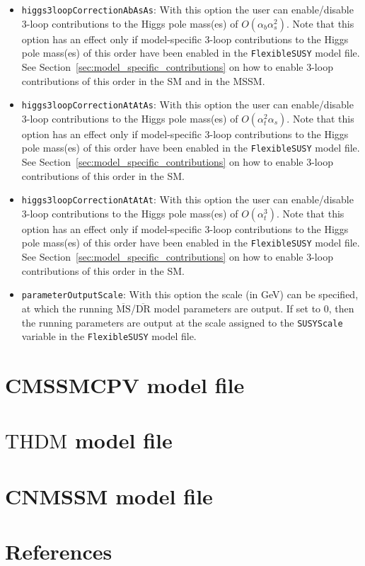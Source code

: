\documentclass[final,3p,11pt,pdflatex]{elsarticle}
\makeatletter
\newcommand{\fs}{\texttt{FlexibleSUSY}\@\xspace}
\newcommand{\code}[1]{\lstinline|#1|}  %
\newcommand{\ol}[1]{\overline{#1}}
\newcommand{\MSbar}{\ensuremath{\ol{\text{MS}}}\xspace}
\newcommand{\DRbar}{\ensuremath{\ol{\text{DR}}}\xspace}
\newcommand{\THDM}{\ensuremath{\text{THDM}}\xspace}
\newcommand{\secref}[1]{Section~\ref{#1}}
\def\at{\alpha_t}
\def\ab{\alpha_b}
\def\as{\alpha_s}
\makeatother
\begin{document}
\begin{itemize}
\item[\texttt{FlexibleSUSY[27]},] \texttt{higgs3loopCorrectionAbAsAs}:
  With this option the user can enable/disable 3-loop contributions to
  the Higgs pole mass(es) of $O(\ab\as^2)$.  Note that this option
  has an effect only if model-specific 3-loop contributions to the
  Higgs pole mass(es) of this order have been enabled in the \fs model file.
  See \secref{sec:model_specific_contributions} on how to enable
  3-loop contributions of this order in the SM and in the
  MSSM\@.

\item[\texttt{FlexibleSUSY[28]},] \texttt{higgs3loopCorrectionAtAtAs}:
  With this option the user can enable/disable 3-loop contributions to
  the Higgs pole mass(es) of $O(\at^2\as)$.  Note that this option
  has an effect only if model-specific 3-loop contributions to the
  Higgs pole mass(es) of this order have been enabled in the \fs model file.
  See \secref{sec:model_specific_contributions} on how to enable
  3-loop contributions of this order in the SM\@.

\item[\texttt{FlexibleSUSY[29]},] \texttt{higgs3loopCorrectionAtAtAt}:
  With this option the user can enable/disable 3-loop contributions to
  the Higgs pole mass(es) of $O(\at^3)$.  Note that this option has
  an effect only if model-specific 3-loop contributions to the Higgs
  pole mass(es) of this order have been enabled in the \fs model file.  See
  \secref{sec:model_specific_contributions} on how to enable 3-loop
  contributions of this order in the SM\@.

\item[\texttt{MODSEL[12]},] \texttt{parameterOutputScale}: With this
  option the scale (in GeV) can be specified, at which the running
  \MSbar/\DRbar model parameters are output.  If set to $0$, then the
  running parameters are output at the scale assigned to the
  \code{SUSYScale} variable in the \fs model file.
\end{itemize}

\section{CMSSMCPV model file}
\label{app:CMSSMCPV}


\section{\THDM model file}
\label{app:THDMIIMSSMBC}


\section{CNMSSM model file}
\label{app:CNMSSM}


\clearpage

\section*{References}



\end{document}
